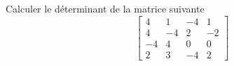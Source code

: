 Calculer le d\'eterminant de la matrice suivante
\[
\left[ 
\begin{array}{cccc}
4 & 1 & -4 & 1\\
4 & -4 & 2 & -2 \\
-4 & 4 & 0 & 0 \\
2 & 3 & -4 & 2
\end{array}
\right]
\]